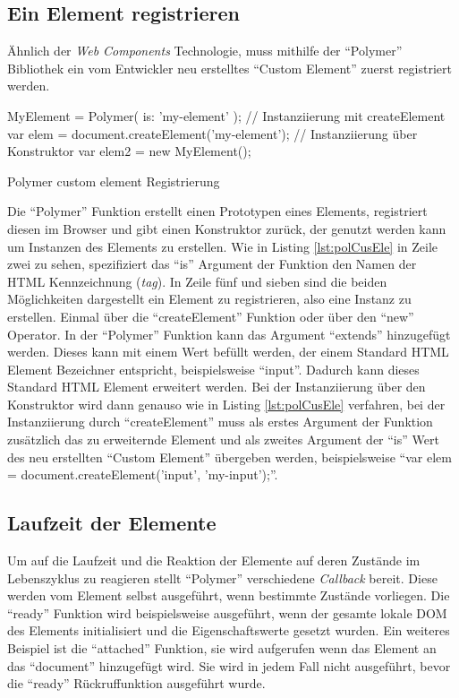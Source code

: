 \documentclass[12pt, paper=a4, bibtotoc, toc=listof, headsepline=true]{scrreprt}
\begin{document}
		\subsection{Ein Element registrieren}
		Ähnlich der \emph{Web Components} Technologie, muss mithilfe der \enquote{Polymer} Bibliothek ein vom Entwickler neu erstelltes \enquote{Custom Element} zuerst registriert werden. 
		\begin{listing}
		\begin{JavaScriptcode*}{}
	MyElement = Polymer({
	   is: 'my-element'
	});
	// Instanziierung mit createElement
	var elem = document.createElement('my-element');
	// Instanziierung über Konstruktor
	var elem2 = new MyElement();
		\end{JavaScriptcode*}
		\caption{Polymer custom element Registrierung}
		\label{lst:polCusEle}
		\end{listing}
Die \enquote{Polymer} Funktion erstellt einen Prototypen eines Elements, registriert diesen im Browser und gibt einen Konstruktor zurück, der genutzt werden kann um Instanzen des Elements zu erstellen. Wie in Listing \ref{lst:polCusEle} in Zeile zwei zu sehen, spezifiziert das \enquote{is} Argument der Funktion den Namen der \ac{HTML} Kennzeichnung (\emph{tag}). In Zeile fünf und sieben sind die beiden Möglichkeiten dargestellt ein Element zu registrieren, also eine Instanz zu erstellen. Einmal über die \enquote{createElement} Funktion oder über den \enquote{new} Operator. In der \enquote{Polymer} Funktion kann das Argument \enquote{extends} hinzugefügt werden. Dieses kann mit einem Wert befüllt werden, der einem Standard \ac{HTML} Element Bezeichner entspricht, beispielsweise \enquote{input}. Dadurch kann dieses Standard \ac{HTML} Element erweitert werden. Bei der Instanziierung über den Konstruktor wird dann genauso wie in Listing \ref{lst:polCusEle} verfahren, bei der Instanziierung durch \enquote{createElement} muss als erstes Argument der Funktion zusätzlich das zu erweiternde Element und als zweites Argument der \enquote{is} Wert des neu erstellten \enquote{Custom Element} übergeben werden, beispielsweise \enquote{var elem = document.createElement('input', 'my-input');}\cite{polyReg}.
\subsection{Laufzeit der Elemente}
\label{sec:polLau}
Um auf die Laufzeit und die Reaktion der Elemente auf deren Zustände im Lebenszyklus zu reagieren stellt \enquote{Polymer} verschiedene \emph{Callback} bereit. Diese werden vom Element selbst ausgeführt, wenn bestimmte Zustände vorliegen. Die \enquote{ready} Funktion wird beispielsweise ausgeführt, wenn der gesamte lokale \ac{DOM} des Elements initialisiert und die Eigenschaftswerte gesetzt wurden. Ein weiteres Beispiel ist die \enquote{attached} Funktion, sie wird aufgerufen wenn das Element an das \enquote{document} hinzugefügt wird. Sie wird in jedem Fall nicht ausgeführt, bevor die \enquote{ready} Rückruffunktion ausgeführt wurde\cite{polyReg}.
\end{document}
